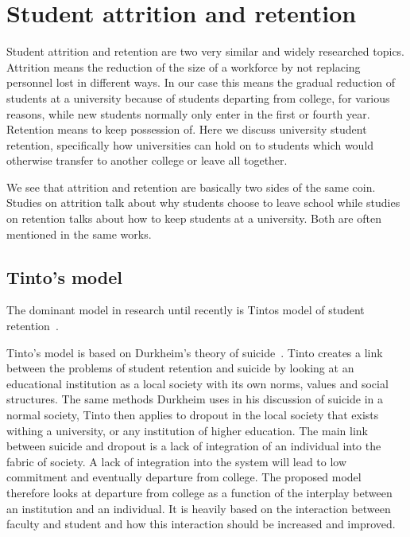 \chapter{Student attrition and retention}
Student attrition and retention are two very similar and widely researched topics. 
Attrition means the reduction of the size of a workforce by not replacing personnel lost in different ways. 
In our case this means the gradual reduction of students at a university because of students departing from college, 
for various reasons, while new students normally only enter in the first or fourth year. 
Retention means to keep possession of. 
Here we discuss university student retention, 
specifically how universities can hold on to students which would otherwise transfer to another college or leave all together.

\bigskip\noindent
We see that attrition and retention are basically two sides of the same coin. 
Studies on attrition talk about why students choose to leave school while studies on retention talks about how to keep students at a university. 
Both are often mentioned in the same works. 

\section{Tinto's model}
The dominant model in research until recently is Tintos model of student retention~\cite{1982}.


\bigskip\noindent
Tinto's model is based on Durkheim's theory of suicide~\cite{Tinto01031975}.
Tinto creates a link between the problems of student retention and suicide by looking at an educational institution as a local society with its own norms, values and social structures.
The same methods Durkheim uses in his discussion of suicide in a normal society, 
Tinto then applies to dropout in the local society that exists withing a university, 
or any institution of higher education.
The main link between suicide and dropout is a lack of integration of an individual into the fabric of society.
A lack of integration into the system will lead to low commitment and eventually departure from college.
The proposed model therefore looks at departure from college as a function of the interplay between an institution and an individual.
It is heavily based on the interaction between faculty and student and how this interaction should be increased and improved.


